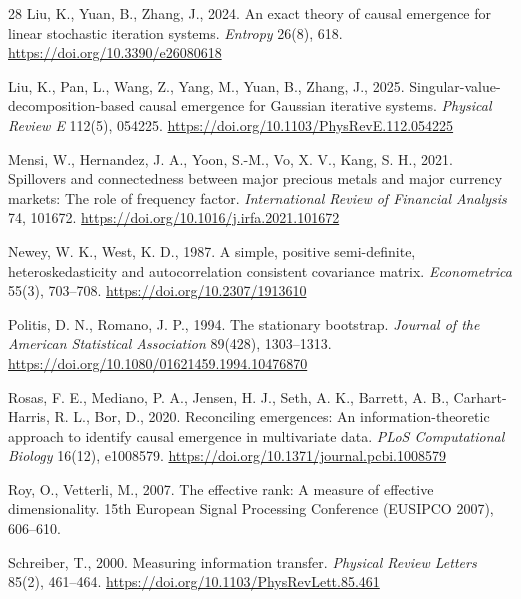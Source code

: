 \documentclass[12pt]{article}
\begin{document}
\begin{thebibliography}{28}
Liu, K., Yuan, B., Zhang, J., 2024.
\newblock An exact theory of causal emergence for linear stochastic iteration systems.
\newblock \emph{Entropy} 26(8), 618. \url{https://doi.org/10.3390/e26080618}

Liu, K., Pan, L., Wang, Z., Yang, M., Yuan, B., Zhang, J., 2025.
\newblock Singular-value-decomposition-based causal emergence for Gaussian iterative systems.
\newblock \emph{Physical Review E} 112(5), 054225. \url{https://doi.org/10.1103/PhysRevE.112.054225}

Mensi, W., Hernandez, J. A., Yoon, S.-M., Vo, X. V., Kang, S. H., 2021.
\newblock Spillovers and connectedness between major precious metals and major currency markets: The role of frequency factor.
\newblock \emph{International Review of Financial Analysis} 74, 101672. \url{https://doi.org/10.1016/j.irfa.2021.101672}

Newey, W. K., West, K. D., 1987.
\newblock A simple, positive semi-definite, heteroskedasticity and autocorrelation consistent covariance matrix.
\newblock \emph{Econometrica} 55(3), 703--708. \url{https://doi.org/10.2307/1913610}

Politis, D. N., Romano, J. P., 1994.
\newblock The stationary bootstrap.
\newblock \emph{Journal of the American Statistical Association} 89(428), 1303--1313. \url{https://doi.org/10.1080/01621459.1994.10476870}

Rosas, F. E., Mediano, P. A., Jensen, H. J., Seth, A. K., Barrett, A. B., Carhart-Harris, R. L., Bor, D., 2020.
\newblock Reconciling emergences: An information-theoretic approach to identify causal emergence in multivariate data.
\newblock \emph{PLoS Computational Biology} 16(12), e1008579. \url{https://doi.org/10.1371/journal.pcbi.1008579}

Roy, O., Vetterli, M., 2007.
\newblock The effective rank: A measure of effective dimensionality.
\newblock 15th European Signal Processing Conference (EUSIPCO 2007), 606--610.

Schreiber, T., 2000.
\newblock Measuring information transfer.
\newblock \emph{Physical Review Letters} 85(2), 461--464. \url{https://doi.org/10.1103/PhysRevLett.85.461}


\end{thebibliography}
\end{document}
